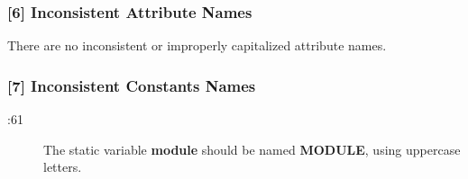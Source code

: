 \subsubsection{[6] Inconsistent Attribute Names}
There are no inconsistent or improperly capitalized attribute names.

\subsubsection{[7] Inconsistent Constants Names}
\begin{description}
	\item[:61] The static variable \textbf{module} should be named \textbf{MODULE}, using uppercase letters.
\end{description}
